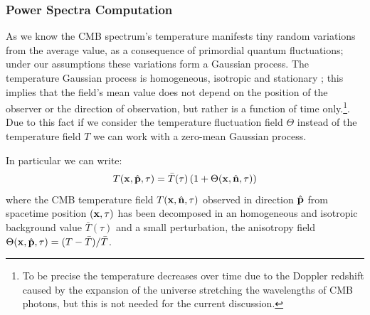 \subsubsection{Power Spectra Computation}
As we know the CMB spectrum's temperature manifests tiny random variations from the average value, as a consequence of primordial quantum fluctuations; under our assumptions these variations form a Gaussian process. The temperature Gaussian process is homogeneous, isotropic and stationary \cite{likelihood_cmb} \cite{modern_cosmology}; this implies that the field's mean value does not depend on the position of the observer or the direction of observation, but rather is a function of time only.\footnote{To be precise the temperature decreases over time due to the Doppler redshift caused by the expansion of the universe stretching the wavelengths of CMB photons, but this is not needed for the current discussion.}. Due to this fact if we consider the temperature fluctuation field $\Theta$ instead of the temperature field $T$ we can work with a zero-mean Gaussian process.

In particular we can write:
\begin{equation*}
    T(\vb{x}, \hat{\vb{p}}, \tau) = \bar{T}(\tau)\left(1+\Theta(\vb{x}, \hat{\vb{n}}, \tau)\right)
\end{equation*}
where the CMB temperature field $T(\vb{x}, \hat{\vb{n}}, \tau)$ observed in direction $\hat{\vb{p}}$ from spacetime position $(\vb{x}, \tau)$ has been decomposed in an homogeneous and isotropic background value $\bar{T}(\tau)$ and a small perturbation, the anisotropy field $\Theta(\vb{x}, \hat{\vb{p}}, \tau) = (T-\bar{T})/\bar{T}$.

